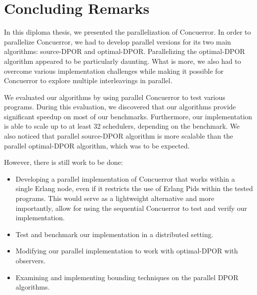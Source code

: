 \chapter{Concluding Remarks}
\label{conclusion}

In this diploma thesis, we presented the parallelization of Concuerror. In order to parallelize Concuerror, we had to develop parallel versions for its two main algorithms: source-DPOR and optimal-DPOR. Parallelizing the optimal-DPOR algorithm appeared to be particularly daunting.
What is more, we also had to overcome various implementation challenges while making it possible for Concuerror to explore multiple interleavings in parallel.

We evaluated our algorithms by using parallel Concuerror to test various programs. During this evaluation, we discovered that our algorithms provide significant speedup on most of our benchmarks. Furthermore, our implementation is able to scale up to at least 32 schedulers, depending on the benchmark. We also noticed that parallel source-DPOR algorithm is more scalable than the parallel optimal-DPOR algorithm, which was to be expected. 


However, there is still work to be done:

\begin{itemize}

\item Developing a parallel implementation of Concuerror that works within a single Erlang node, even if it restricts the use of Erlang Pids within the tested programs. This would serve as a lightweight alternative and more importantly, allow for using the sequential Concuerror to test and verify our implementation. 

\item Test and benchmark our implementation in a distributed setting.

\item Modifying our parallel implementation to work with optimal-DPOR with observers.

\item Examining and implementing bounding techniques on the parallel DPOR algorithms.


\end{itemize}
